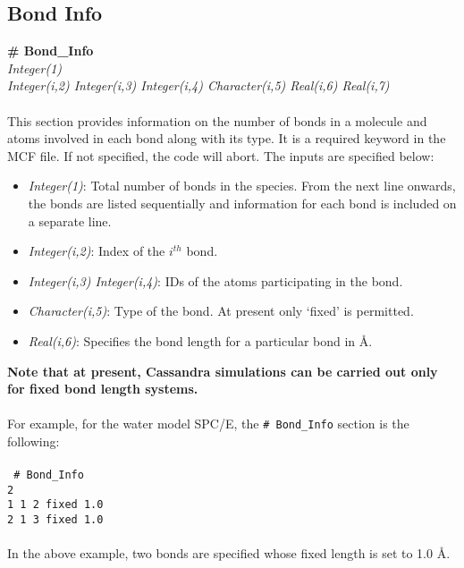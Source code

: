 \subsection{Bond Info}\label{sec:Get_Bond_Info}
%
{\bf \# Bond\_Info} \\
{\it Integer(1)} \\
{\it Integer(i,2) Integer(i,3) Integer(i,4) Character(i,5) Real(i,6) Real(i,7)} \\
\\
This section provides information on the number of bonds in a molecule
and atoms involved in each bond along with its type.  It is a required keyword in the MCF file. If not specified, the code
will abort. The inputs are specified below: \\ 
%
\begin{itemize}

\item {\it Integer(1)}: Total number of bonds in the species. From the
next line onwards, the bonds are listed sequentially and information
for each bond is included on a separate line.
%
\item {\it Integer(i,2)}:  Index of the $i^{th}$ bond.
%
\item {\it Integer(i,3) Integer(i,4)}: IDs of the atoms participating in
the bond.
%
\item {\it Character(i,5)}: Type of the bond. At present only
`fixed' is  permitted. 
\item {\it Real(i,6)}: Specifies the bond length for a particular bond in \AA.

\end{itemize}
%
{\bf Note that at present, Cassandra simulations can be carried out
  only for fixed bond length systems.} \\ \\
%
For example, for the water model SPC/E, the \texttt{\# Bond\_Info} section is the following: \\ \\
%
\texttt{
\# Bond\_Info \\
2 \\
1    1    2    fixed     1.0 \\
2    1    3    fixed     1.0 \\
} \\
%
In the above example, two bonds are specified whose fixed length is set to 1.0 \AA.

